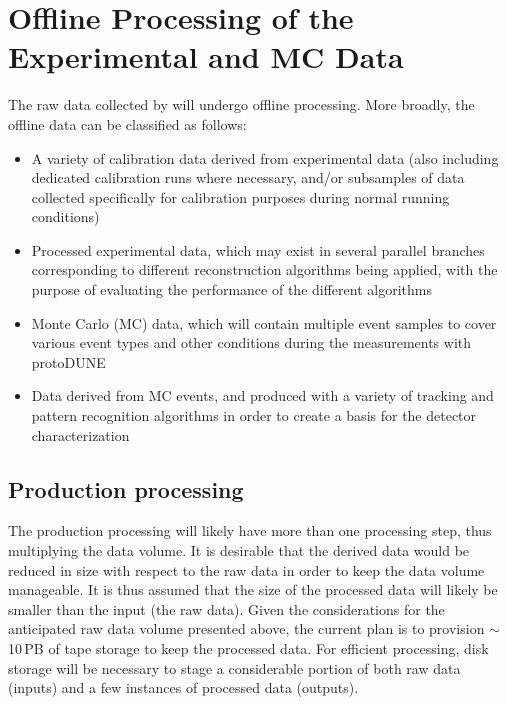 \section{Offline Processing of the Experimental and MC Data}
\label{sec:protodune-offline}



The raw data collected by \pd will undergo offline processing. More broadly, the offline data
can be classified as follows:
\begin{itemize}

\item A variety of calibration data derived from experimental data (also including dedicated calibration
runs where necessary, and/or subsamples of data collected specifically for calibration
purposes during normal running conditions)

\item Processed experimental data, which may exist in several parallel branches corresponding to
different reconstruction algorithms being applied, with the purpose of evaluating the performance
of the different algorithms

\item Monte Carlo (MC) data, which will contain multiple event samples to cover various event types
and other conditions during the measurements with protoDUNE

\item Data derived from MC events, and produced with a variety of tracking and pattern recognition algorithms
in order to create a basis for the detector characterization

\end{itemize}

\subsection{Production processing}
\label{sec:prod-process}

The production processing will likely have more than one processing step,
thus multiplying the data volume. It is desirable that the derived data would be reduced
in size with respect to the raw data in order to keep the data volume manageable.
It is thus assumed that the size of the processed data will likely be smaller than the input (the raw data). 
Given the considerations for the anticipated raw data volume presented above,
the current plan is to provision $\sim$10\,PB of tape storage to keep the processed data. 
For efficient processing, disk storage will be necessary
to stage a considerable portion of both raw data (inputs) and a few instances of processed data (outputs).

